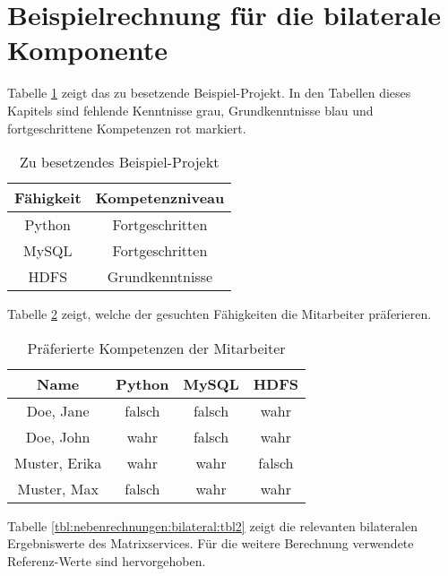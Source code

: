 \section{Beispielrechnung für die bilaterale Komponente}
\label{ch:nebenrechnungen:bilateral}
Tabelle \ref{tbl:nebenrechnungen:bilateral:tbl1} zeigt das zu besetzende Beispiel-Projekt. In den Tabellen dieses Kapitels sind fehlende Kenntnisse grau, Grundkenntnisse blau und fortgeschrittene Kompetenzen rot markiert.
\begin{table}[h]
	\centering
	\begin{tabular}{c|c}
		Fähigkeit & Kompetenzniveau \\
		\hline
		Python  & \cellcolor{usercolor}Fortgeschritten\\
		MySQL   & \cellcolor{usercolor}Fortgeschritten\\
		HDFS    & \cellcolor{itemcolor}Grundkenntnisse
	\end{tabular}
	\caption{Zu besetzendes Beispiel-Projekt}
	\label{tbl:nebenrechnungen:bilateral:tbl1}
\end{table}

Tabelle \ref{tbl:nebenrechnungen:bilateral:tbl3} zeigt, welche der gesuchten Fähigkeiten die Mitarbeiter präferieren.
\begin{table}[h]
	\centering
	\begin{tabular}{c|c|c|c}
		Name & Python & MySQL & HDFS \\
		\hline
		Doe, Jane     & \cellcolor{usercolor}falsch & \cellcolor{usercolor}falsch & \cellcolor{itemcolor}wahr\\
		Doe, John     & \cellcolor{itemcolor}wahr   & \cellcolor{itemcolor}falsch   & \cellcolor{itemcolor}wahr\\
		Muster, Erika & \cellcolor{itemcolor}wahr   & \cellcolor{usercolor}wahr & \cellcolor{usercolor}falsch\\
		Muster, Max   & \cellcolor{usercolor}falsch & \cellcolor{itemcolor}wahr   & \cellcolor{itemcolor}wahr
	\end{tabular}
	\caption{Präferierte Kompetenzen der Mitarbeiter}
	\label{tbl:nebenrechnungen:bilateral:tbl3}
\end{table}

Tabelle \ref{tbl:nebenrechnungen:bilateral:tbl2} zeigt die relevanten bilateralen Ergebniswerte des Matrixservices. Für die weitere Berechnung verwendete Referenz-Werte sind hervorgehoben.

